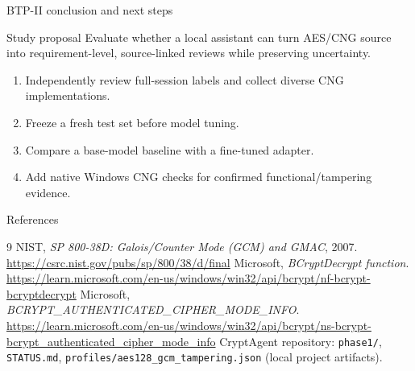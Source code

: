 \documentclass[aspectratio=169,10pt]{beamer}
\begin{document}
\begin{frame}{BTP-II conclusion and next steps}
\begin{block}{Study proposal}
Evaluate whether a local assistant can turn AES/CNG source into requirement-level, source-linked reviews while preserving uncertainty.
\end{block}
\begin{enumerate}
\item Independently review full-session labels and collect diverse CNG implementations.
\item Freeze a fresh test set before model tuning.
\item Compare a base-model baseline with a fine-tuned adapter.
\item Add native Windows CNG checks for confirmed functional/tampering evidence.
\end{enumerate}
\end{frame}

\begin{frame}{References}
\scriptsize
\begin{thebibliography}{9}
 NIST, \emph{SP 800-38D: Galois/Counter Mode (GCM) and GMAC}, 2007. \url{https://csrc.nist.gov/pubs/sp/800/38/d/final}
 Microsoft, \emph{BCryptDecrypt function}. \url{https://learn.microsoft.com/en-us/windows/win32/api/bcrypt/nf-bcrypt-bcryptdecrypt}
 Microsoft, \emph{BCRYPT\_AUTHENTICATED\_CIPHER\_MODE\_INFO}. \url{https://learn.microsoft.com/en-us/windows/win32/api/bcrypt/ns-bcrypt-bcrypt_authenticated_cipher_mode_info}
 CryptAgent repository: \texttt{phase1/}, \texttt{STATUS.md}, \texttt{profiles/aes128\_gcm\_tampering.json} (local project artifacts).
\end{thebibliography}
\end{frame}
\end{document}
